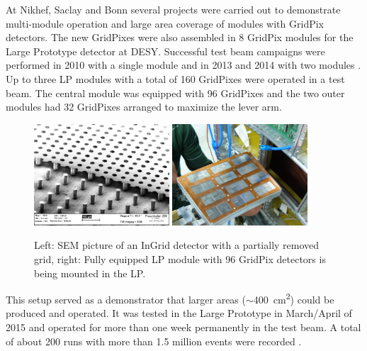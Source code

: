 At Nikhef, Saclay and Bonn several projects were carried out to demonstrate
multi-module operation and large area coverage of modules with GridPix
detectors. The new GridPixes were also assembled in 8
GridPix modules for the Large Prototype detector at DESY. Successful test beam
campaigns were performed in 2010 with a single module and in 2013 and 2014 
with two modules \cite{1748-0221-9-01-C01033}. Up to three LP modules
with a total of 160 GridPixes were operated in a test beam. The central module was equipped with 96
GridPixes and the two outer modules had 32 GridPixes arranged to maximize the
lever arm. 
\begin{figure}[!t]
  \centering
  \includegraphics[width=0.45\textwidth]{Tracker/TPC_Bonn/plots/TPC_pixels_GridPix.png}
  \includegraphics[width=0.45\textwidth]{Tracker/TPC_Bonn/plots/TPC_pixel_complete_module.png}
  \caption{Left: SEM picture of an InGrid detector with a partially removed
    grid, right: Fully equipped LP module with 96 GridPix detectors is being
    mounted in the LP.}
  \label{fig_TPC_pixels_1}
\end{figure}

This setup served as a demonstrator that larger areas ($\sim$\SI{400}{\centi\meter\squared}) could be produced and operated. It was tested in the Large Prototype in March/April of 2015 and operated for more than one week permanently in the
test beam. A total of about 200 runs with more than 1.5 million events were recorded \cite{7889045}.

